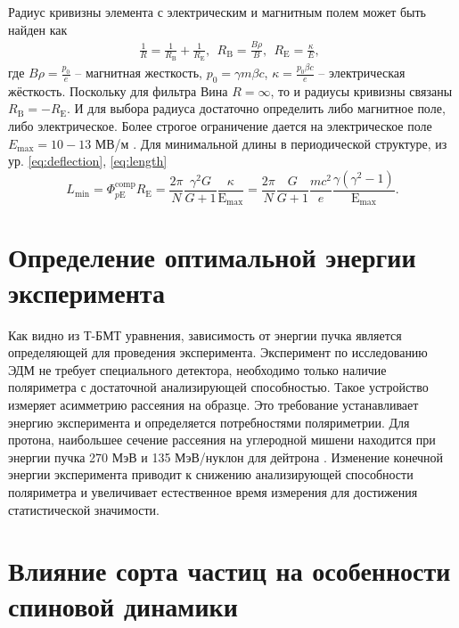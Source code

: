 \par Радиус кривизны элемента с электрическим и магнитным полем может быть найден как
\begin{equation}
	\begin{gathered}
		\frac{1}{R}  = \frac{1}{R_\textrm{B}}+\frac{1}{R_\textrm{E}}, \ \ 
		R_\textrm{B}  = \frac{B\rho}{B}, \ \ 
		R_\textrm{E}  = \frac{\kappa}{E}, \ \ 
	\end{gathered}
\end{equation}
где $B\rho=\frac{p_0}{e}$ – магнитная жесткость, $p_0=\gamma m\beta c$, $\kappa=\frac{p_0\beta c}{e}$ – электрическая жёсткость.
Поскольку для фильтра Вина $R=\infty$, то и радиусы кривизны связаны $R_{\textrm{B}}=-R_{\textrm{E}}$. И для выбора радиуса достаточно определить либо магнитное поле, либо электрическое. Более строгое ограничение дается на электрическое поле $E_{\textrm{max}}=10-13$ МВ/м \cite{Wien}. Для минимальной длины в периодической структуре, из ур. \ref{eq:deflection}, \ref{eq:length} 
\begin{equation}
		L_{\text{min}} = \Phi_{p\mathrm{E}}^{\text{comp}}R_{\mathrm{E}}=
		\frac{2\pi}{N}\frac{\gamma^2 G}{G+1}\frac{\kappa}{\mathrm{E}_{\text{max}}}
		 = \frac{2\pi}{N}\frac{G}{G+1}\frac{mc^2}{e}\frac{\gamma(\gamma^2-1)}{\mathrm{E}_{\text{max}}}.
		\label{eq:length_min}
\end{equation}


	\section{Определение оптимальной энергии эксперимента}\label{sec:EDM/requirements/energy}
\par Как видно из Т-БМТ уравнения, зависимость от энергии пучка является определяющей для проведения эксперимента. Эксперимент по исследованию ЭДМ не требует специального детектора, необходимо только наличие поляриметра с достаточной анализирующей способностью. Такое устройство измеряет асимметрию рассеяния на образце. Это требование устанавливает энергию эксперимента и определяется потребностями поляриметрии. Для протона, наибольшее сечение рассеяния на углеродной мишени находится при энергии пучка 270 МэВ и 135 МэВ/нуклон для дейтрона \cite{JEDI:polarimeter, skhomenko:polarimeter}. Изменение конечной энергии эксперимента приводит к снижению анализирующей способности поляриметра и увеличивает естественное время измерения для достижения статистической значимости.

	\section{Влияние сорта частиц на особенности спиновой динамики}\label{sec:EDM/requirements/particles}

